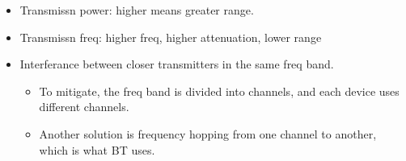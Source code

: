 \documentclass[10pt]{article}
\begin{document}
\begin{itemize}
    \item Transmissn power: higher means greater range.
    \item Transmissn freq: higher freq, higher attenuation, lower range
    \item Interferance between closer transmitters in the same freq band.
    \begin{itemize}
        \item To mitigate, the freq band is divided into channels, and each device uses different channels.
        \item Another solution is frequency hopping from one channel to another, which is what BT uses.
    \end{itemize}
\end{itemize}
\end{document}
